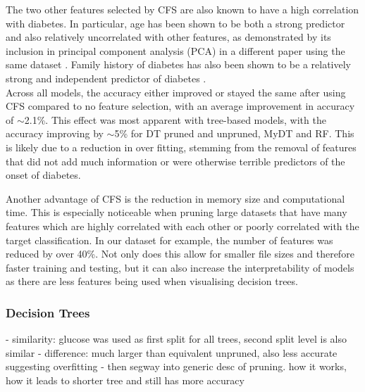 The two other features selected by CFS are also known to have a high correlation with diabetes. In particular, age has been shown to be both a strong predictor \cite{i} and also relatively uncorrelated with other features, as demonstrated by its inclusion in principal component analysis (PCA) in a different paper using the same dataset \cite{c}. Family history of diabetes has also been shown to be a relatively strong and independent predictor of diabetes \cite{j}. \\


Across all models, the accuracy either improved or stayed the same after using CFS compared to no feature selection, with an average improvement in accuracy of $\sim$2.1\%. This effect was most apparent with tree-based models, with the accuracy improving by $\sim$5\% for DT pruned and unpruned, MyDT and RF. This is likely due to a reduction in over fitting, stemming from the removal of features that did not add much information or were otherwise terrible predictors of the onset of diabetes.

Another advantage of CFS is the reduction in memory size and computational time. This is especially noticeable when pruning large datasets that have many features which are highly correlated with each other  or poorly correlated with the target classification. In our dataset for example, the number of features was reduced by over 40\%. Not only does this allow for smaller file sizes and therefore faster training and testing, but it can also increase the interpretability of models as there are less features being used when visualising decision trees.

\subsubsection{Decision Trees}




- similarity: glucose was used as first split for all trees, second split level is also similar
- difference: much larger than equivalent unpruned, also less accurate suggesting overfitting
- then segway into generic desc of pruning. how it works, how it leads to shorter tree and still has more accuracy




